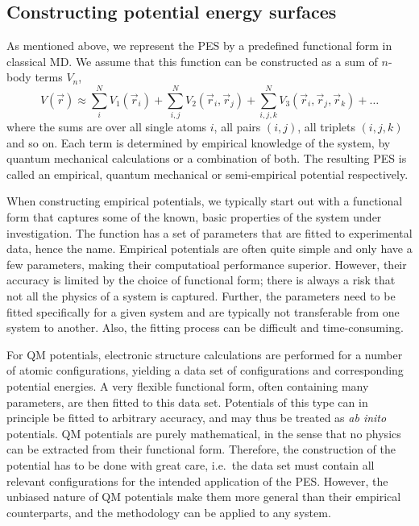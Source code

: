 \documentclass[twoside,english]{uiofysmaster}
\begin{document}
\subsection{Constructing potential energy surfaces} \label{sec:constructingPES}
As mentioned above, we represent the PES by a predefined functional form in classical MD. We assume that this
function can be constructed as a sum of $n$-body terms $V_n$,
\begin{equation}
 V(\vec{r}) \approx \sum_i^N V_1(\vec{r}_i) + \sum_{i,j}^N V_2(\vec{r}_i, \vec{r}_j) + 
 \sum_{i,j,k}^N V_3(\vec{r}_i, \vec{r}_j, \vec{r}_k) + \dots
 \label{generalPotential}
\end{equation}
where the sums are over all single atoms $i$, all pairs $(i,j)$, all triplets $(i,j,k)$ and so on. 
Each term is determined by empirical knowledge of the system, by quantum mechanical calculations or a combination of both. 
The resulting PES is called an empirical, quantum mechanical or semi-empirical potential respectively. 

When constructing empirical potentials, we typically start out with a functional form that captures some of the known, basic properties
of the system under investigation. The function has a set of parameters that are fitted to experimental data, hence the name.
Empirical potentials are often quite simple and only have a few parameters, making their computatioal performance superior. 
However, their
accuracy is limited by the choice of functional form; there is always a risk that not all the physics of a system
is captured. Further, the parameters need to be fitted specifically for a given system and are typically not transferable 
from one system to another. Also, the fitting process can be difficult and time-consuming. 

For QM potentials, electronic structure calculations are performed for a number of atomic configurations, yielding a data set
of configurations and corresponding potential energies. A very flexible functional form, often containing many parameters, 
are then fitted to this data set. Potentials of this type can in principle be fitted to arbitrary accuracy, and may thus 
be treated as \textit{ab inito} potentials. QM potentials are purely mathematical,
in the sense that no physics can be extracted from their functional form. Therefore, the construction of the potential
has to be done with great care, i.e.\ the data set must contain all relevant configurations for the intended application
of the PES. However, the unbiased nature of QM potentials make them more general than their empirical counterparts,
and the methodology can be applied to any system. 
\end{document}
